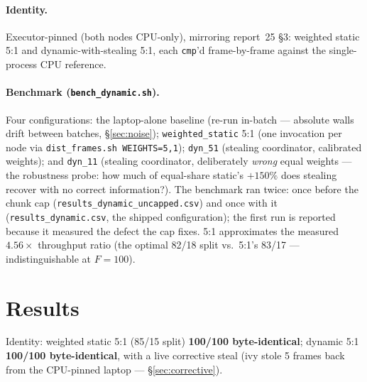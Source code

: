 \documentclass[
	english,
	letterpaper, oneside
]{article}
\begin{document}
\paragraph{Identity.} Executor-pinned (both nodes CPU-only), mirroring
report~25 \S3: weighted static 5:1 and dynamic-with-stealing 5:1, each
\texttt{cmp}'d frame-by-frame against the single-process CPU reference.

\paragraph{Benchmark (\texttt{bench\_dynamic.sh}).} Four configurations:
the laptop-alone baseline (re-run in-batch --- absolute walls drift between
batches, \S\ref{sec:noise}); \texttt{weighted\_static} 5:1 (one invocation
per node via \texttt{dist\_frames.sh WEIGHTS=5,1}); \texttt{dyn\_51}
(stealing coordinator, calibrated weights); and \texttt{dyn\_11} (stealing
coordinator, deliberately \emph{wrong} equal weights --- the robustness
probe: how much of equal-share static's $+150\%$ does stealing recover with
no correct information?). The benchmark ran twice: once before the chunk
cap (\texttt{results\_dynamic\_uncapped.csv}) and once with it
(\texttt{results\_dynamic.csv}, the shipped configuration); the first run
is reported because it measured the defect the cap fixes. 5:1 approximates
the measured $4.56\times$ throughput ratio (the optimal 82/18 split vs.\
5:1's 83/17 --- indistinguishable at $F=100$).

\section{Results}
\label{sec:results}

Identity: weighted static 5:1 (85/15 split) \textbf{100/100
byte-identical}; dynamic 5:1 \textbf{100/100 byte-identical}, with a live
corrective steal (ivy stole 5 frames back from the CPU-pinned laptop ---
\S\ref{sec:corrective}).
\end{document}

